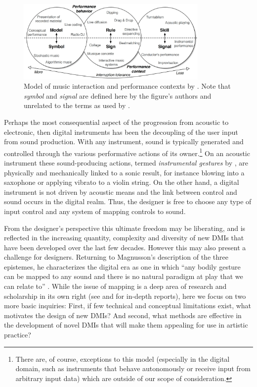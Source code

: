 \documentclass[Sullivan_phd_thesis.tex]{subfiles}
\begin{document}
\begin{figure}[htpb]
    \centering
    \includegraphics[width=0.83\textwidth]{images/ch3_malloch_model_of_interaction.jpg}
    \caption[Model of music interaction and performance contexts]{Model of music interaction and performance contexts by \textcite{Malloch2006}. Note that \emph{symbol} and \emph{signal} are defined here by the figure's authors and unrelated to the terms as used by \textcite{Magnusson2019}.}
    \label{ch3-fig:malloch-model-of-interaction}
\end{figure}

Perhaps the most consequential aspect of the progression from acoustic to electronic, then digital instruments has been the decoupling of the user input from sound production. With any instrument, sound is typically generated and controlled through the various performative actions of its owner.\footnote{There are, of course, exceptions to this model (especially in the digital domain, such as instruments that behave autonomously or receive input from arbitrary input data) which are outside of our scope of consideration.} On an acoustic instrument these sound-producing actions, termed \emph{instrumental gestures} by \textcite{Cadoz1988}, are physically and mechanically linked to a sonic result, for instance blowing into a saxophone or applying vibrato to a violin string. On the other hand, a digital instrument is not driven by acoustic means and the link between control and sound occurs in the digital realm. Thus, the designer is free to choose any type of input control and any system of mapping controls to sound.

From the designer's perspective this ultimate freedom may be liberating, and is reflected in the increasing quantity, complexity and diversity of new DMIs that have been developed over the last few decades. However this may also present a challenge for designers. Returning to Magnusson's description of the three epistemes, he characterizes the digital era as one in which ``any bodily gesture can be mapped to any sound and there is no natural paradigm at play that we can relate to'' \parencite*[p. 34]{Magnusson2019}. While the issue of mapping is a deep area of research and scholarship in its own right (see \textcite{os-mapping-2002} and \textcite{cmj-mapping-2014} for in-depth reports), here we focus on two more basic inquiries: First, if few technical and conceptual limitations exist, what motivates the design of new DMIs? And second, what methods are effective in the development of novel DMIs that will make them appealing for use in artistic practice?
\end{document}

